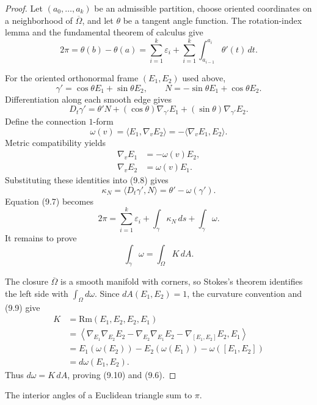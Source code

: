 \begin{proof}
\sketch
Let $(a_0,\ldots,a_k)$ be an admissible partition, choose oriented
coordinates on a neighborhood of $\overline\Omega$, and let $\theta$ be a
tangent angle function.  The rotation-index lemma and the fundamental theorem
of calculus give
\begin{equation}
2\pi=\theta(b)-\theta(a)
=\sum_{i=1}^k\varepsilon_i
+\sum_{i=1}^k\int_{a_{i-1}}^{a_i}\theta'(t)\,dt. \tag{9.7}
\end{equation}

For the oriented orthonormal frame $(E_1,E_2)$ used above,
\[
\gamma'=\cos\theta E_1+\sin\theta E_2,
\qquad
N=-\sin\theta E_1+\cos\theta E_2.
\]
Differentiation along each smooth edge gives
\begin{equation}
D_t\gamma'=\theta'N+(\cos\theta)\nabla_{\gamma'}E_1
+(\sin\theta)\nabla_{\gamma'}E_2. \tag{9.8}
\end{equation}
Define the connection $1$-form
\[
\omega(v)=\langle E_1,\nabla_vE_2\rangle
=-\langle\nabla_vE_1,E_2\rangle.
\]
Metric compatibility yields
\begin{align}
\nabla_vE_1&=-\omega(v)E_2,\\
\nabla_vE_2&=\omega(v)E_1.
\label{eq:covariant-frame-derivatives}
\tag{9.9}
\end{align}
Substituting these identities into (9.8) gives
\[
\kappa_N=\langle D_t\gamma',N\rangle
=\theta'-\omega(\gamma').
\]
Equation (9.7) becomes
\[
2\pi=\sum_{i=1}^k\varepsilon_i
+\int_\gamma\kappa_N\,ds+\int_\gamma\omega.
\]
It remains to prove
\begin{equation}
\int_\gamma\omega=\int_\Omega K\,dA. \tag{9.10}
\end{equation}

The closure $\overline\Omega$ is a smooth manifold with corners, so Stokes's
theorem identifies the left side with $\int_\Omega d\omega$.  Since
$dA(E_1,E_2)=1$, the curvature convention and (9.9) give
\begin{align*}
K
&=\mathrm{Rm}(E_1,E_2,E_2,E_1)\\
&=\left\langle
\nabla_{E_1}\nabla_{E_2}E_2
-\nabla_{E_2}\nabla_{E_1}E_2
-\nabla_{[E_1,E_2]}E_2,E_1\right\rangle\\
&=E_1(\omega(E_2))-E_2(\omega(E_1))-\omega([E_1,E_2])\\
&=d\omega(E_1,E_2).
\end{align*}
Thus $d\omega=K\,dA$, proving (9.10) and (9.6).
\end{proof}

\begin{corollary}
\label{cor:angle-sum-theorem}
The interior angles of a Euclidean triangle sum to $\pi$.
\end{corollary}


